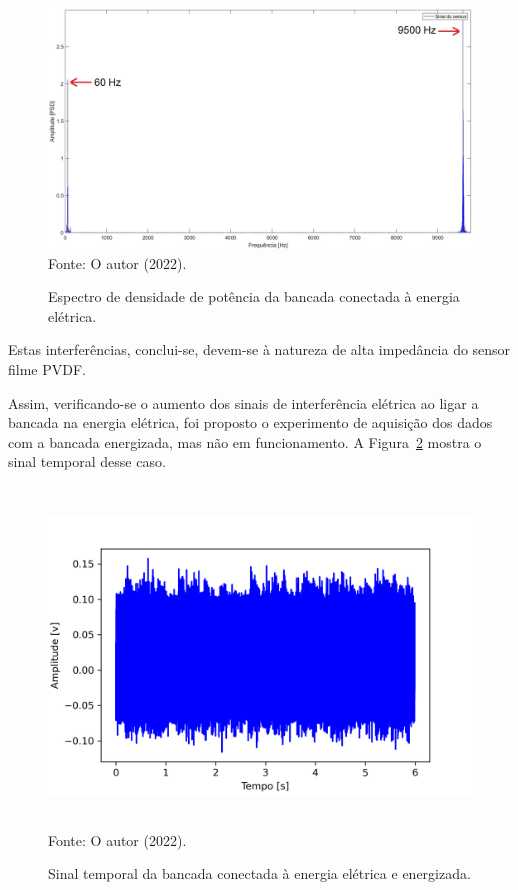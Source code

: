 \documentclass[
	12pt,				
	oneside,			
	a4paper,			
	english,			
	brazil,			
	]{abntex2ppgsi}
\begin{document}
{{{\begin{figure}[H]
\centering
\caption {Espectro de densidade de potência da bancada conectada à energia elétrica.}
\includegraphics[width=170mm,keepaspectratio]{GraficosAnalise/PSD_SENSOR_MAQUINA_LIGADA} \\
Fonte: O autor (2022).
\label{PSD_SENSOR_MAQUINA_LIGADA}
\end{figure} 

Estas interferências, conclui-se, devem-se à natureza de alta impedância do sensor filme PVDF.  

Assim, verificando-se o aumento dos sinais de interferência elétrica ao ligar a bancada na energia elétrica, foi proposto o experimento de aquisição dos dados com a bancada energizada, mas não em funcionamento. A Figura~\ref{maquina_ligada_na_tomada_e_energizada} mostra o sinal temporal desse caso.

\begin{figure}[H]
\centering
\caption {Sinal temporal da bancada conectada à energia elétrica e energizada.}
\includegraphics[width=\textwidth,height=90mm,keepaspectratio]{Caso0/maquina_ligada_na_tomada_e_energizada} \\
Fonte: O autor (2022).
\label{maquina_ligada_na_tomada_e_energizada}
\end{figure} 

}}}
\end{document}

